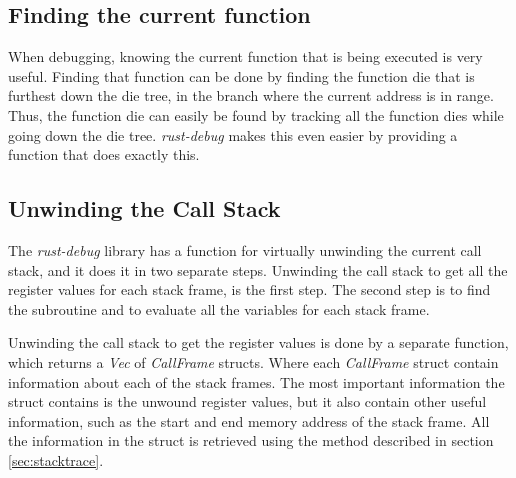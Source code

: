 \subsection{Finding the current function} \label{sec:funcdie} %
When debugging, knowing the current function that is being executed is very useful.
Finding that function can be done by finding the function \gls{die} that is furthest down the \gls{die} tree, in the branch where the current address is in range.
Thus, the function \gls{die} can easily be found by tracking all the function \glspl{die} while going down the \gls{die} tree.
\emph{rust-debug} makes this even easier by providing a function that does exactly this.


%
%
%
%


\subsection{Unwinding the Call Stack}

The \emph{rust-debug} library has a function for virtually unwinding the current call stack, and it does it in two separate steps.
Unwinding the call stack to get all the register values for each stack frame, is the first step.
The second step is to find the subroutine and to evaluate all the variables for each stack frame.


Unwinding the call stack to get the register values is done by a separate function, which returns a \emph{Vec} of \emph{CallFrame} structs.
Where each \emph{CallFrame} struct contain information about each of the stack frames.
The most important information the struct contains is the unwound register values, but it also contain other useful information, such as the start and end memory address of the stack frame.
All the information in the struct is retrieved using the method described in section \ref{sec:stacktrace}.


